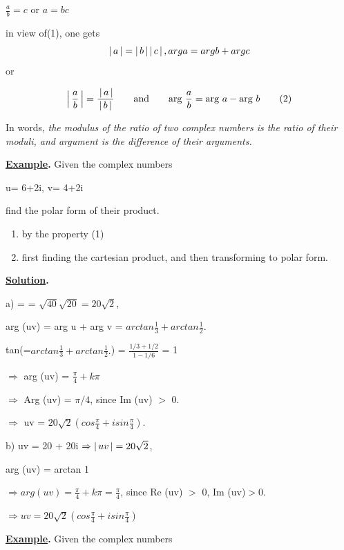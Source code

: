 \documentclass[11pt]{amsbook}
\newcommand\tab[1][2cm]{\hspace*{#1}}
\newcommand\tad[1][1cm]{\hspace*{#1}}
\newcommand\tal[1][0.5cm]{\hspace*{#1}}
\begin{document}

\centerline{$\frac{a}{b} = c $  or  $a=bc$}
in view of(1), one gets
\[
\left \lvert \, a \, \right \rvert=\left \lvert \, b \, \right \rvert\left \lvert \, c \, \right \rvert, arg a = arg b+ arg c\label{2}
\]
or

\[
\left \lvert \, \frac{a}{b} \, \right \rvert = \frac{{}\left \lvert \, a \, \right \rvert}{\left \lvert \, b \, \right \rvert} \qquad \text{and} \qquad \text{arg } \frac{a}{b} = \text{arg } a - \text{arg } b \tag{2}\label{myeq}
\] 

\tad In words, \textit{the modulus of the ratio of two complex numbers is the ratio of their moduli, and argument is the difference of their arguments.}

\textbf{\underline{Example}.} Given the complex numbers	

\tab	u= 6+2i,  v= 4+2i

find the polar form of their product.

\begin{enumerate}[label=(\alph*)]
	\item by the property (1) 
	\item first finding the cartesian product, and then transforming to polar form.
\end{enumerate}

\textbf{\underline{Solution}.}

a)  =   \tad   {} = $\sqrt{40}\sqrt{20} = 20\sqrt{2}$,


\tal arg (uv) = arg u + arg v = $ arctan\frac{1}{3} + arctan\frac{1}{2}. $ 

\tal tan(=$ arctan\frac{1}{3} + arctan\frac{1}{2}. $) = $ \frac{1/3 + 1/2}{1 - 1/6}	$ = 1

\tal $\Rightarrow$ arg (uv) = $\frac{\pi}{4} +  k\pi$

\tal $\Rightarrow$ Arg (uv) = $\pi/4$, since Im (uv) $>$	 0.

\tal $\Rightarrow$ uv = $20\sqrt{2}(cos \frac{\pi}{4} + i sin \frac{\pi}{4})$.

b) uv = 20 + 20i $\Rightarrow  \left \lvert \, uv \, \right \rvert = 20\sqrt{2}$,

\tal arg (uv) = arctan 1

$\Rightarrow arg (uv) = \frac{\pi}{4} + k\pi = \frac{\pi}{4}$, since Re (uv) $>$ 0, Im (uv)$>0$.

\tab \tad $\Rightarrow uv = 20\sqrt{2}(cos\frac{\pi}{4}+ isin\frac{\pi}{4})$

\textbf{\underline{Example}.} Given the complex numbers	
\end{document}
